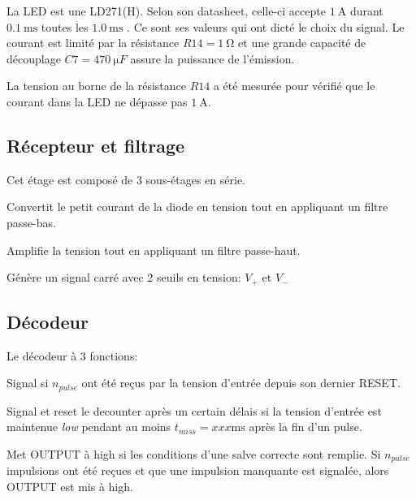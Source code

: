 \documentclass[french]{layout/Report}
\begin{document}
La LED est une LD271(H). Selon son datasheet, celle-ci accepte $\SI{1}{\ampere}$ durant $\SI{0.1}{\milli\second}$ toutes les $\SI{1.0}{\milli\second}$ \cite{LD271(H)}. Ce sont ses valeurs qui ont dicté le choix du signal. Le courant est limité par la résistance $R14 = \SI{1}{\ohm}$ et une grande capacité de découplage $\mathit{C7}=\SI{470}{\micro F}$ assure la puissance de l'émission.

La tension au borne de la résistance $\mathit{R14}$ a été mesurée pour vérifié que le courant dans la LED ne dépasse pas $\SI{1}{\ampere}$.

\subsection{Récepteur et filtrage}
Cet étage est composé de 3 sous-étages en série.
\begin{description}[leftmargin=!,labelwidth=5cm, labelindent=\parindent]
	\item[Conversion \& low-pass] Convertit le petit courant de la diode en tension tout en appliquant un filtre passe-bas.
	\item[Amplification \& high-pass] Amplifie la tension tout en appliquant un filtre passe-haut.
	\item[Schmidt trigger] Génère un signal carré avec 2 seuils en tension: $V_+$ et $V_-$
\end{description}

\subsection{Décodeur}
Le décodeur à 3 fonctions:

\begin{description}[leftmargin=!,labelwidth=4cm, labelindent=\parindent]
	\item[Decounter] Signal si $n_{pulse}$ ont été reçus par la tension d'entrée depuis son dernier RESET.
	\item[Missing pulse detector] Signal et reset le decounter après un certain délais si la tension d'entrée est maintenue \emph{low} pendant au moins $t_{miss} = xxx \si{\milli\second}$ après la fin d'un pulse.
	\item[Logic] Met OUTPUT à high si les conditions d'une salve correcte sont remplie. Si $n_{pulse}$ impulsions ont été reçues et que une impulsion manquante est signalée, alors OUTPUT est mis à high. 
\end{description}
\end{document}
